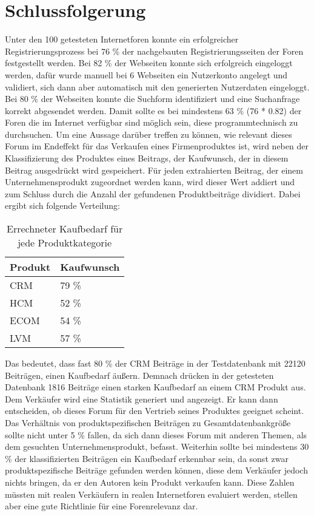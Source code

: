 \section{Schlussfolgerung}
Unter den 100 getesteten Internetforen konnte ein erfolgreicher Registrierungsprozess bei 76 \% der nachgebauten Registrierungsseiten der Foren festgestellt werden. Bei 82 \% der Webseiten konnte sich erfolgreich eingeloggt werden, dafür wurde manuell bei 6 Webseiten ein Nutzerkonto angelegt und validiert, sich dann aber automatisch mit den generierten Nutzerdaten eingeloggt. Bei 80 \% der Webseiten konnte die Suchform identifiziert und eine Suchanfrage korrekt abgesendet werden. Damit sollte es bei mindestens 63 \% (76 * 0.82) der Foren die im Internet verfügbar sind möglich sein, diese programmtechnisch zu durchsuchen.
Um eine Aussage darüber treffen zu können, wie relevant dieses Forum im Endeffekt für das Verkaufen eines Firmenproduktes ist, wird neben der Klassifizierung des Produktes eines Beitrags, der Kaufwunsch, der in diesem Beitrag ausgedrückt wird gespeichert. Für jeden extrahierten Beitrag, der einem Unternehmensprodukt zugeordnet werden kann, wird dieser Wert addiert und zum Schluss durch die Anzahl der gefundenen Produktbeiträge dividiert. Dabei ergibt sich folgende Verteilung: 

\begin{table}[h!]
\centering
\begin{tabular}{ | p{3cm} | l |}
\hline
Produkt & Kaufwunsch\\ \hline
CRM & 79 \% \\ \hline
HCM & 52 \% \\ \hline
ECOM & 54 \% \\ \hline
LVM & 57 \% \\ \hline
\end{tabular}
\caption{Errechneter Kaufbedarf für jede Produktkategorie}
\end{table}

Das bedeutet, dass fast 80 \% der CRM Beiträge in der Testdatenbank mit 22120 Beiträgen, einen Kaufbedarf äußern. Demnach drücken in der getesteten Datenbank 1816 Beiträge einen starken Kaufbedarf an einem CRM Produkt aus. Dem Verkäufer wird eine Statistik generiert und angezeigt. Er kann dann entscheiden, ob dieses Forum für den Vertrieb seines Produktes geeignet scheint. Das Verhältnis von produktspezifischen Beiträgen zu Gesamtdatenbankgröße sollte nicht unter 5 \% fallen, da sich dann dieses Forum mit anderen Themen, als dem gesuchten Unternehmensprodukt, befasst. Weiterhin sollte bei mindestens 30 \% der klassifizierten Beiträgen ein Kaufbedarf erkennbar sein, da sonst zwar produktspezifische Beiträge gefunden werden können, diese dem Verkäufer jedoch nichts bringen, da er den Autoren kein Produkt verkaufen kann. Diese Zahlen müssten mit realen Verkäufern in realen Internetforen evaluiert werden, stellen aber eine gute Richtlinie für eine Forenrelevanz dar.

